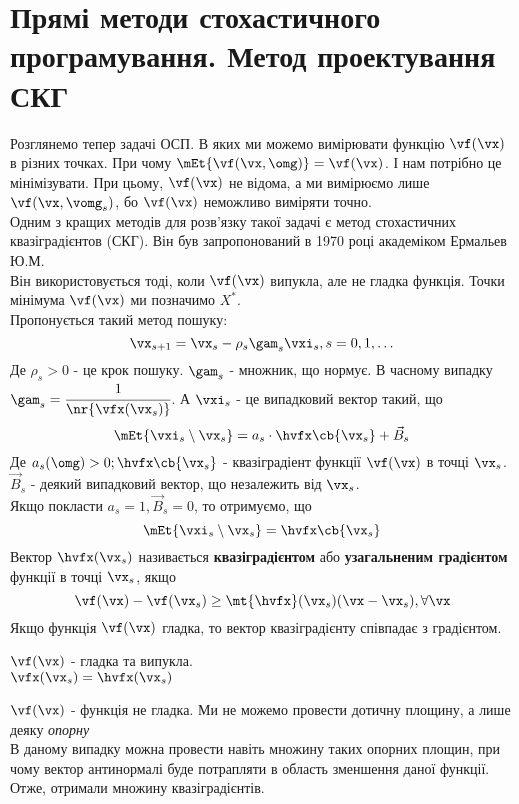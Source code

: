 \section{Прямі методи стохастичного програмування. Метод проектування СКГ}
Розглянемо тепер задачі ОСП. В яких ми можемо вимірювати функцію $\vf(\vx)$ в різних точках. При чому $\mEt{\vf(\vx,\omg)} = \vf(\vx)$. І нам потрібно це мінімізувати. При цьому, $\vf(\vx)$ не відома, а ми вимірюємо лише $\vf(\vx,\vomg_s)$, бо $\vf(\vx)$ неможливо виміряти точно.\\
Одним з кращих методів для розв’язку такої задачі є метод стохастичних квазіградієнтов (СКГ). Він був запропонований в 1970 році академіком Ермальев Ю.М.\\
Він використовується тоді, коли $\vf(\vx)$ випукла, але не гладка функція. Точки мінімума $\vf(\vx)$ ми позначимо $X^\ast$.\\
Пропонується такий метод пошуку: 
\begin{equation}
\vx_{s+1} = \vx_s - \rho_s\gam_s\vxi_s,s=0,1,\ldots
\end{equation}
Де $\rho_s>0$ - це крок пошуку. $\gam_s$ - множник, що нормує. В часному випадку $\gam_s = \cfrac1{\nr{\vfx(\vx_s)}}$. А $\vxi_s$ - це випадковий вектор такий, що 
\begin{equation}
\mEt{\vxi_s\setminus \vx_s} = a_s \cdot \hvfx\cb{\vx_s}+\vec{B}_s
\end{equation}
Де $a_s(\omg)>0; \hvfx\cb{\vx_s}$ - квазіградіент функції $\vf(\vx)$ в точці $\vx_s$. $\vec{B}_s$ - деякий випадковий вектор, що незалежить від  $\vx_s$.\\
Якщо покласти $a_s = 1,\vec{B}_s =0$, то отримуємо, що 
\begin{equation}
\mEt{\vxi_s\setminus \vx_s} = \hvfx\cb{\vx_s}
\end{equation}
Вектор $\hvfx(\vx_s)$ називається {\bf квазіградієнтом} або {\bf узагальненим градієнтом} функції в точці $\vx_s$, якщо
\begin{equation}
\vf(\vx) - \vf(\vx_s) \geq \mt{\hvfx}(\vx_s) (\vx-\vx_s),\forall \vx
\end{equation}
Якщо функція $\vf(\vx)$ гладка, то вектор квазіградієнту співпадає з градієнтом.
\begin{exs}
$\vf(\vx)$ - гладка та випукла. \\
$\vfx(\vx_s) = \hvfx(\vx_s)$
\end{exs}
\begin{exs}
$\vf(\vx)$ - функція не гладка.
Ми не можемо провести дотичну площину, а лише деяку \textit{опорну}\\
В даному випадку можна провести навіть множину таких опорних площин, при чому вектор антинормалі буде потрапляти в область зменшення даної функції. Отже, отримали множину квазіградієнтів.
\end{exs}
